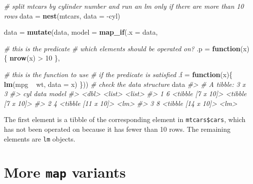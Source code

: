 \documentclass[]{book}
\newenvironment{Shaded}{}{}
\newcommand{\CommentTok}[1]{\textcolor[rgb]{0.38,0.63,0.69}{\textit{#1}}}
\newcommand{\ControlFlowTok}[1]{\textcolor[rgb]{0.00,0.44,0.13}{\textbf{#1}}}
\newcommand{\DataTypeTok}[1]{\textcolor[rgb]{0.56,0.13,0.00}{#1}}
\newcommand{\DecValTok}[1]{\textcolor[rgb]{0.25,0.63,0.44}{#1}}
\newcommand{\KeywordTok}[1]{\textcolor[rgb]{0.00,0.44,0.13}{\textbf{#1}}}
\newcommand{\NormalTok}[1]{#1}
\newcommand{\OperatorTok}[1]{\textcolor[rgb]{0.40,0.40,0.40}{#1}}
\newcommand{\StringTok}[1]{\textcolor[rgb]{0.25,0.44,0.63}{#1}}
\begin{document}
\begin{Shaded}
\begin{Highlighting}[]
\CommentTok{# split mtcars by cylinder number and run an lm only if there are more than 10 rows}
\NormalTok{data =}\StringTok{ }\KeywordTok{nest}\NormalTok{(mtcars, }\DataTypeTok{data =} \OperatorTok{-}\NormalTok{cyl)}

\NormalTok{data =}\StringTok{ }\KeywordTok{mutate}\NormalTok{(data,}
              \DataTypeTok{model =} \KeywordTok{map_if}\NormalTok{(}\DataTypeTok{.x =}\NormalTok{ data,}
                             
                             \CommentTok{# this is the predicate}
                             \CommentTok{# which elements should be operated on?}
                             \DataTypeTok{.p =} \ControlFlowTok{function}\NormalTok{(x)\{}
                               \KeywordTok{nrow}\NormalTok{(x) }\OperatorTok{>}\StringTok{ }\DecValTok{10}
\NormalTok{                             \},}
                             
                             \CommentTok{# this is the function to use}
                             \CommentTok{# if the predicate is satisfied}
                             \DataTypeTok{.f =} \ControlFlowTok{function}\NormalTok{(x)\{}
                               \KeywordTok{lm}\NormalTok{(mpg }\OperatorTok{~}\StringTok{ }\NormalTok{wt, }\DataTypeTok{data =}\NormalTok{ x)}
\NormalTok{                             \}))}
\CommentTok{# check the data structure}
\NormalTok{data}
\CommentTok{#> # A tibble: 3 x 3}
\CommentTok{#>     cyl data               model            }
\CommentTok{#>   <dbl> <list>             <list>           }
\CommentTok{#> 1     6 <tibble [7 x 10]>  <tibble [7 x 10]>}
\CommentTok{#> 2     4 <tibble [11 x 10]> <lm>             }
\CommentTok{#> 3     8 <tibble [14 x 10]> <lm>}
\end{Highlighting}
\end{Shaded}

The first element is a tibble of the corresponding element in \texttt{mtcars\$cars}, which has not been operated on because it has fewer than 10 rows. The remaining elements are \texttt{lm} objects.

\hypertarget{more-map-variants}{%
\section{\texorpdfstring{More \texttt{map} variants}{More map variants}}\label{more-map-variants}}
\end{document}
